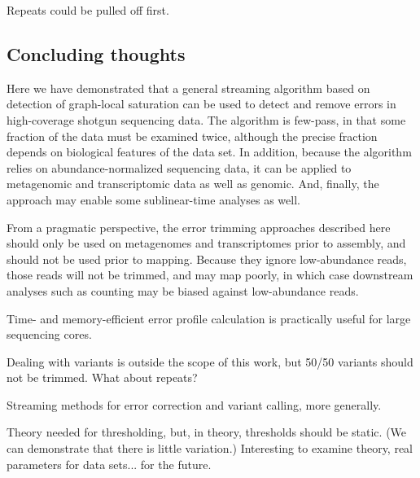 \documentclass{article}
\begin{document}
Repeats could be pulled off first.

\subsection{Concluding thoughts}

Here we have demonstrated that a general streaming algorithm based on
detection of graph-local saturation can be used to detect and remove
errors in high-coverage shotgun sequencing data.  The algorithm is
few-pass, in that some fraction of the data must be examined twice,
although the precise fraction depends on biological features of the
data set.  In addition, because the algorithm relies on
abundance-normalized sequencing data, it can be applied to metagenomic
and transcriptomic data as well as genomic.  And, finally, the approach
may enable some sublinear-time analyses as well.

From a pragmatic perspective, the error trimming approaches described
here should only be used on metagenomes and transcriptomes prior to
assembly, and should not be used prior to mapping.  Because they
ignore low-abundance reads, those reads will not be trimmed, and may
map poorly, in which case downstream analyses such as counting may be
biased against low-abundance reads.

Time- and memory-efficient error profile calculation is practically useful
for large sequencing cores.

Dealing with variants is outside the scope of this work, but 50/50
variants should not be trimmed.  What about repeats?

Streaming methods for error correction and variant calling, more generally.

Theory needed for thresholding, but, in theory, thresholds should be
static.  (We can demonstrate that there is little variation.)  Interesting
to examine theory, real parameters for data sets... for the future.
\end{document}
